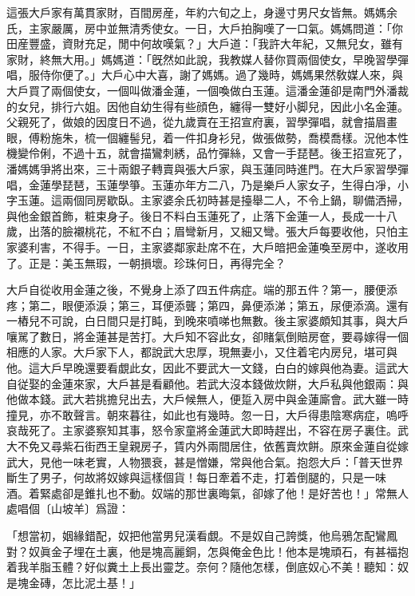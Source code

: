 這張大戶家有萬貫家財，百間房産，年約六旬之上，身邊寸男尺女皆無。媽媽余氏，主家嚴厲，房中並無清秀使女。一日，大戶拍胸嘆了一口氣。媽媽問道：「你田産豐盛，資財充足，閒中何故嘆氣？」大戶道：「我許大年紀，又無兒女，雖有家財，終無大用。」媽媽道：「旣然如此說，我教媒人替你買兩個使女，早晚習學彈唱，服侍你便了。」大戶心中大喜，謝了媽媽。過了幾時，媽媽果然敎媒人來，與大戶買了兩個使女，一個叫做潘金蓮，一個喚做白玉蓮。這潘金蓮卻是南門外潘裁的女兒，排行六姐。因他自幼生得有些顔色，纏得一雙好小脚兒，因此小名金蓮。父親死了，做娘的因度日不過，從九歲賣在王招宣府裏，習學彈唱，就會描眉畫眼，傅粉施朱，梳一個纏髻兒，着一件扣身衫兒，做張做勢，喬模喬樣。況他本性機變伶俐，不過十五，就會描鸞刺綉，品竹彈絲，又會一手琵琶。後王招宣死了，潘媽媽爭將出來，三十兩銀子轉賣與張大戶家，與玉蓮同時進門。在大戶家習學彈唱，金蓮學琵琶，玉蓮學箏。玉蓮亦年方二八，乃是樂戶人家女子，生得白凈，小字玉蓮。這兩個同房歇臥。主家婆余氏初時甚是擡舉二人，不令上鍋，聊備洒掃，與他金銀首飾，粧束身子。後日不料白玉蓮死了，止落下金蓮一人，長成一十八歲，出落的臉襯桃花，不紅不白；眉彎新月，又細又彎。張大戶每要收他，只怕主家婆利害，不得手。一日，主家婆鄰家赴席不在，大戶暗把金蓮喚至房中，遂收用了。正是：美玉無瑕，一朝損壞。珍珠何日，再得完全？

大戶自從收用金蓮之後，不覺身上添了四五件病症。端的那五件？第一，腰便添疼；第二，眼便添淚；第三，耳便添聾；第四，鼻便添涕；第五，尿便添滴。還有一樁兒不可說，白日間只是打盹，到晚來噴㖒也無數。後主家婆頗知其事，與大戶嚷駡了數日，將金蓮甚是苦打。大戶知不容此女，卻賭氣倒賠房奩，要尋嫁得一個相應的人家。大戶家下人，都說武大忠厚，現無妻小，又住着宅内房兒，堪可與他。這大戶早晚還要看覷此女，因此不要武大一文錢，白白的嫁與他為妻。這武大自従娶的金蓮來家，大戶甚是看顧他。若武大沒本錢做炊餅，大戶私與他銀兩：與他做本錢。武大若挑擔兒出去，大戶候無人，便踅入房中與金蓮廝會。武大雖一時撞見，亦不敢聲言。朝來暮往，如此也有幾時。忽一日，大戶得患陰寒病症，嗚呼哀哉死了。主家婆察知其事，怒令家童將金蓮武大即時趕出，不容在房子裏住。武大不免又尋紫石街西王皇親房子，賃内外兩間居住，依舊賣炊餅。原來金蓮自從嫁武大，見他一味老實，人物猥衰，甚是憎嫌，常與他合氣。抱怨大戶：「普天世界斷生了男子，何故將奴嫁與這樣個貨！每日牽着不走，打着倒腿的，只是一味𠳹酒。着緊處卻是錐扎也不動。奴端的那世裏晦氣，卻嫁了他！是好苦也！」常無人處唱個〔山坡羊〕爲證：

\begin{myquote}
「想當初，姻緣錯配，奴把他當男兒漢看覷。不是奴自己誇獎，他烏鴉怎配鸞鳳對？奴眞金子埋在土裏，他是塊高麗銅，怎與俺金色比！他本是塊頑石，有甚福抱着我羊脂玉體？好似糞土上長出靈芝。奈何？隨他怎樣，倒底奴心不美！聽知：奴是塊金磚，怎比泥土基！」
\end{myquote}

